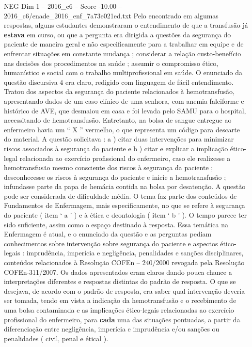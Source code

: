 \begin{textsample}{NEG Dim 1 – 2016\_c6 – Score -10.00 – 2016\_c6/enade\_2016\_enf\_7a73e021ed.txt}
Pelo encontrado em algumas respostas, alguns estudantes demonstraram o entendimento de que a transfusão já \textbf{estava} em curso, ou que a pergunta era dirigida a questões da segurança do paciente de maneira geral e não especificamente para a trabalhar em equipe e de enfrentar situações em constante mudança ; considerar a relação custo-benefício nas decisões dos procedimentos na saúde ; assumir o compromisso ético, humanístico e social com o trabalho multiprofissional em saúde.
O enunciado da questão discursiva 4 era claro, redigido com linguagem de fácil entendimento.
Tratou dos aspectos da segurança do paciente relacionados à hemotransfusão, apresentando dados de um caso clínico de uma senhora, com anemia falciforme e histórico de AVE, que desmaiou em casa e foi levada pelo SAMU para o hospital, necessitando de hemotransfusão.
Entretanto, na bolsa de sangue entregue ao enfermeiro havia um “ X ” vermelho, o que representa um código para descarte do material.
A questão solicitava : a ) citar duas intervenções para minimizar riscos associados à segurança do paciente e b ) citar e explicar a implicação ético-legal relacionada ao exercício profissional do enfermeiro, caso ele realizesse a hemotransfusão mesmo consciente dos riscos à segurança da paciente ; desconhecesse os riscos à segurança do paciente e inicie a hemotransfusão ; infundasse parte da papa de hemácia contida na bolsa por desatenção.
A questão pode ser considerada de dificuldade média.
O tema faz parte dos conteúdos de Fundamentos de Enfermagem, mais especificamente, no que se refere à segurança do paciente ( item ‘ a ’ ) e à ética e deontologia ( item ‘ b ’ ).
O tempo parece ter sido suficiente, assim como o espaço destinado à resposta.
Essa temática na Enfermagem é atual, e o enunciado da questão e as perguntas pediam conhecimentos sobre intervenção sobre segurança do paciente e aspectos ético-legais : imprudência, imperícia e negligência, penalidades e sanções disciplinares, conteúdos relacionados à Resolução COFEn – 240/2000 revogada pela Resolução COFEn-311/2007.
Os dados apresentados eram claros dando pouca chance a interpretações diferentes e respostas distintas do padrão de resposta.
O que se desejava, de acordo com o padrão de resposta, era saber qual intervenção deveria ser tomada, tendo em vista a indicação da hemotransfusão e o recebimento de uma bolsa contaminada e as implicações ético-legais relacionadas ao exercício profissional do enfermeiro, para \textbf{cada} uma das situações pontuadas, a partir da diferenciação entre negligência, imperícia e imprudência e/ou sanções ou penalidades ( civil, penal e étical ).

\end{textsample}
